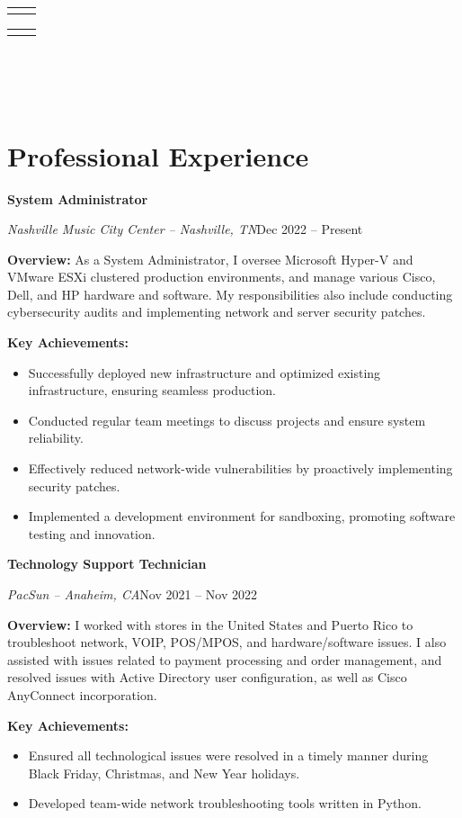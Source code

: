 \documentclass[a4paper]{article}
\makeatletter
\renewcommand{\maketitle}{
  \begin{widebox}
    {\huge\bfseries\textsf\theauthor} \\
    \medskip{}
    \begin{tabular}{@{}c|c@{}}
        \faIcon{linkedin} \textsf{\applinkedinurl{}} & \faIcon{github} \textsf{\appgithuburl{}}
    \end{tabular}
    \begin{tabular}{@{}c|c@{}}
        \faIcon{mobile} \textsf{\appcellphone{}} & \faIcon{envelope} \textsf{\appemail{}}
    \end{tabular} \\
    \medskip{}
    \faIcon{home} \textsf{\appaddresslineone{}} \\
    \textsf{\appaddresslinetwo{}} \\
    \textsf{\appaddresslinethree{}}
  \end{widebox}
}
\makeatother
\begin{document}
\author{\textsf{\appfirstname{} \applastname{}}}

\maketitle

\section{Professional Experience}
\begin{minipage}{\textwidth}
\textbf{System Administrator}\par
\textit{Nashville Music City Center -- Nashville, TN}\hfill Dec 2022 -- Present

\medskip
\textbf{Overview:} As a System Administrator, I oversee Microsoft Hyper-V and VMware ESXi clustered production environments, and manage various Cisco, Dell, and HP hardware and software. My responsibilities also include conducting cybersecurity audits and implementing network and server security patches.

\medskip
\textbf{Key Achievements:} 
\begin{itemize}
    \item Successfully deployed new infrastructure and optimized existing infrastructure, ensuring seamless production.
    \item Conducted regular team meetings to discuss projects and ensure system reliability.
    \item Effectively reduced network-wide vulnerabilities by proactively implementing security patches.
    \item Implemented a development environment for sandboxing, promoting software testing and innovation.
\end{itemize}
\end{minipage}

\vspace{10pt}
\begin{minipage}{\textwidth}
\textbf{Technology Support Technician}\par
\textit{PacSun -- Anaheim, CA}\hfill Nov 2021 -- Nov 2022

\medskip
\textbf{Overview:} I worked with stores in the United States and Puerto Rico to troubleshoot network, VOIP, POS/MPOS, and hardware/software issues. I also assisted with issues related to payment processing and order management, and resolved issues with Active Directory user configuration, as well as Cisco AnyConnect incorporation.

\medskip
\textbf{Key Achievements:}
\begin{itemize}
    \item Ensured all technological issues were resolved in a timely manner during Black Friday, Christmas, and New Year holidays.
    \item Developed team-wide network troubleshooting tools written in Python.
\end{itemize}
\end{minipage}
\end{document}
